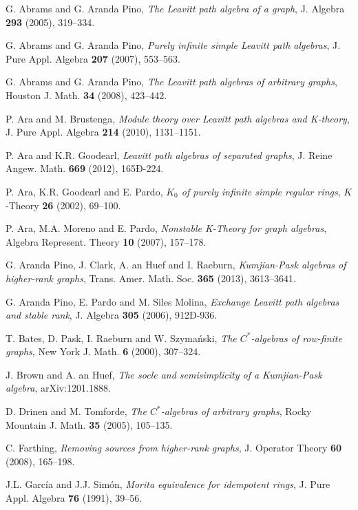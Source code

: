 \documentclass[a4paper,12pt]{amsart}
\numberwithin{equation}{section}
\theoremstyle{definition}
\theoremstyle{remark}
\begin{document}
\begin{thebibliography}{99}

 G. Abrams and G. Aranda Pino, \emph{The Leavitt path algebra of a graph}, 
J. Algebra \textbf{293} (2005), 319--334.

 G. Abrams and  G. Aranda Pino, \emph{Purely infinite simple Leavitt path algebras}, J. Pure Appl. Algebra \textbf{207} (2007), 553--563.

 G. Abrams and  G. Aranda Pino, \emph{The Leavitt path algebras of arbitrary graphs},
Houston J. Math. \textbf{34} (2008), 423--442. 

P. Ara and M. Brustenga, 
\emph{Module theory over Leavitt path algebras and K-theory},  J. Pure Appl. Algebra \textbf{214} (2010), 1131--1151. 

 P.  Ara and K.R.  Goodearl, \emph{Leavitt path algebras of separated graphs}, J. Reine Angew. Math. \textbf{669} (2012), 165Ð-224.

 P. Ara, K.R. Goodearl and  E. Pardo, \emph{$K_0$ of purely infinite simple regular rings}, $K$-Theory \textbf{26} (2002), 69--100.

 P. Ara, M.A. Moreno and E. Pardo, \emph{Nonstable K-Theory for graph algebras}, 
Algebra Represent. Theory \textbf{10} (2007), 157--178.

 G. Aranda Pino, J. Clark, A. an Huef and I. Raeburn,
\emph{Kumjian-Pask algebras of higher-rank graphs}, Trans. Amer. Math. Soc. \textbf{365 } (2013), 3613--3641. 

   G. Aranda Pino, E. Pardo and M. Siles Molina, \emph{Exchange Leavitt path algebras and stable rank},  J. Algebra \textbf{305} (2006), 912Ð-936. 

 T. Bates, D. Pask, I. Raeburn and W. Szyma\'nski, \emph{The $C^*$-algebras of row-finite
graphs}, New York J. Math. \textbf{6} (2000), 307--324.

 J. Brown and A. an Huef, \emph{The socle and semisimplicity of a Kumjian-Pask algebra}, arXiv:1201.1888.

 D. Drinen and M. Tomforde, \emph{The $C^*$-algebras of arbitrary graphs}, Rocky Mountain J. Math.
\textbf{35} (2005), 105--135.
    
 C. Farthing, \emph{Removing sources from higher-rank graphs},
 J. Operator Theory \textbf{60} (2008), 165--198.
 
  J.L. Garc\'ia and J.J. Sim\'on, \emph{Morita equivalence for idempotent rings}, J. Pure Appl. Algebra \textbf{76} (1991), 39--56.
 

\end{thebibliography}
\end{document}
